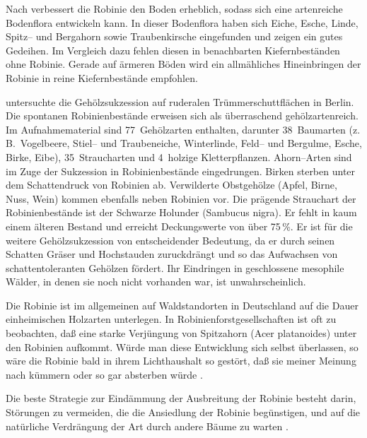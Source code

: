 \documentclass[twocolumn]{scrartcl}
\begin{document}
Nach \citet[S.~90--92]{erteld1952robinieErtrag} verbessert die Robinie
den Boden erheblich, sodass sich eine artenreiche Bodenflora
entwickeln kann. In dieser Bodenflora haben sich Eiche, Esche, Linde,
Spitz-- und Bergahorn sowie Traubenkirsche eingefunden und zeigen ein
gutes Gedeihen. Im Vergleich dazu fehlen diesen in benachbarten
Kiefernbeständen ohne Robinie. Gerade auf ärmeren Böden wird ein
allmähliches Hineinbringen der Robinie in reine Kiefernbestände
empfohlen.

\citet{kowarik1990robinie} untersuchte die Gehölzsukzession auf
ruderalen Trümmerschuttflächen in Berlin. Die spontanen
Robinienbestände erweisen sich als überraschend gehölzartenreich. Im
Aufnahmematerial sind 77~Gehölzarten enthalten, darunter 38~Baumarten
(z.\,B.\ Vogelbeere, Stiel-- und Traubeneiche, Winterlinde, Feld-- und
Bergulme, Esche, Birke, Eibe), 35~Straucharten und 4~holzige
Kletterpflanzen. Ahorn--Arten sind im Zuge der Sukzession in
Robinienbestände eingedrungen. Birken sterben unter dem Schattendruck
von Robinien ab. Verwilderte Obstgehölze (Apfel, Birne, Nuss, Wein)
kommen ebenfalls neben Robinien vor. Die prägende Strauchart der
Robinienbestände ist der Schwarze Holunder (Sambucus nigra). Er fehlt
in kaum einem älteren Bestand und erreicht Deckungswerte von über
75\,\%. Er ist für die weitere Gehölzsukzession von entscheidender
Bedeutung, da er durch seinen Schatten Gräser und Hochstauden
zuruckdrängt und so das Aufwachsen von schattentoleranten Gehölzen
fördert. Ihr Eindringen in geschlossene mesophile Wälder, in denen sie
noch nicht vorhanden war, ist unwahrscheinlich.

Die Robinie ist im allgemeinen auf Waldstandorten in Deutschland auf
die Dauer einheimischen Holzarten unterlegen. In
Robinienforstgesellschaften ist oft zu beobachten, daß eine starke
Verjüngung von Spitzahorn (Acer platanoides) unter den Robinien
aufkommt. Würde man diese Entwicklung sich selbst überlassen, so wäre
die Robinie bald in ihrem Lichthaushalt so gestört, daß sie meiner
Meinung nach kümmern oder so gar absterben würde
\citep{kohler1963robinie}.

Die beste Strategie zur Eindämmung der Ausbreitung der Robinie besteht
darin, Störungen zu vermeiden, die die Ansiedlung der Robinie
begünstigen, und auf die natürliche Verdrängung der Art durch andere
Bäume zu warten \citep{motta2009robinieBekaempfung}.
\end{document}
